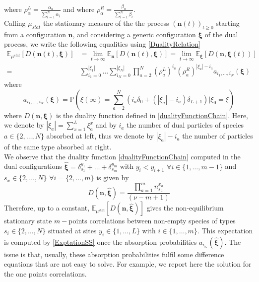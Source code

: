 \documentclass[11pt]{article}
\numberwithin{equation}{section}
\numberwithin{equation}{subsection}
\begin{document}
where $\rho_{\alpha}^{L}=\frac{\alpha_{a}}{\sum_{i=1}^{N}\alpha_{i}}$ and where $\rho_{\alpha}^{R}=\frac{\beta_{a}}{\sum_{i=1}^{N}\beta_{i}}$.\\
Calling $\mu_{stat}$ the stationary measure of the the process $(\bm{n}(t))_{t\geq 0}$ starting from a configuration $\bm{n}$, and considering a generic configuration $\bm{\xi}$ of the dual process, we write the following equalities using \eqref{DualityRelation}
\begin{equation}\label{ExptationSS}
	\begin{split}
		\mathbb{E}_{\mu^{stat}}\left[D(\bm{n}(t),\bm{\xi})\right]&=\lim_{t\to\infty}\mathbb{E}_{\bm{n}}\left[D(\bm{n}(t),\bm{\xi})\right]=\lim_{t\to\infty}\mathbb{E}_{\bm{\xi}}\left[D(\bm{n},\bm{\xi}(t))\right]
		\\=&
		\sum_{i_{1}=0}^{|\xi_{1}|}\ldots\sum_{i_{N}=0}^{|\xi_{N}|}\prod_{a=2}^{N}\left(\rho_{a}^{L}\right)^{i_{a}}\left(\rho_{a}^{R}\right)^{|\xi_{a}|-i_{a}}a_{i_{1},\ldots,i_{N}}(\bm{\xi})
	\end{split}
\end{equation}
where 
\begin{equation}\label{Pass}
	a_{i_{1},\ldots,i_{N}}(\bm{\xi})=\mathbb{P}\left(\xi(\infty)=\sum_{a=2}^{N}\left(i_{a}\delta_{0}+(|\xi_{a}|-i_{a})\delta_{L+1}\right)| \xi_{0}=\xi\right)
\end{equation}
where $D(\bm{n},\bm{\xi})$ is the duality function defined in \eqref{dualityFunctionChain}. Here, we denote by $|\xi_{a}|=\sum_{x=1}^{L}\xi_{a}^{x}$ and by $i_{a}$ the number of dual particles of species $a\in\{2,\ldots,N\}$ absorbed at left, thus we denote by $|\xi_{a}|-i_{a}$ the number of particles of the same type absorbed at right.\\
We observe that the duality function \eqref{dualityFunctionChain} computed in the dual configurations $\bm{\widehat{\xi}}=\delta_{s_{1}}^{y_{1}}+\ldots+\delta_{s_{m}}^{y_{m}}$ with $y_{i}<y_{i+1}$ $\forall i\in \{1,\ldots,m-1\}$ and $s_{x}\in \{2,\ldots,N\}$ $\forall i=\{2,\ldots,m\}$ is given by 
\begin{equation}
	D(\bm{n},\bm{\widehat{\xi}})= \frac{\prod_{a=1}^{m}n_{s_{a}}^{x_{a}}}{(\nu-m+1)}
\end{equation}
Therefore, up to a constant, $\mathbb{E}_{\mu^{\text{stat}}}\left[D(\bm{n},\bm{\widehat{\xi}})\right]$ gives the non-equilibrium stationary state $m-$points correlations between non-empty species of types $s_{i}\in\{2,\ldots,N\}$ situated at sites $y_{i}\in\{1,\ldots,L\}$ with $i\in \{1,\ldots,m\}$. This expectation is computed by \eqref{ExptationSS} once the absorption probabilities $a_{i_{s_{a}}}(\widehat{\bm{\xi}})$. The issue is that, usually, these absorption probabilities fulfil some difference equations that are not easy to solve. For example, we report here the solution for the one points correlations. 
\end{document}
